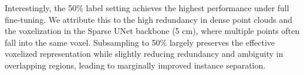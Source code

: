 \documentclass[review,authoryear]{elsarticle}
\begin{document}
Interestingly, the 50\% label setting achieves the highest performance under full fine-tuning. We attribute this to the high redundancy in dense point clouds and the voxelization in the Sparse UNet backbone (5 cm), where multiple points often fall into the same voxel. Subsampling to 50\% largely preserves the effective voxelized representation while slightly reducing redundancy and ambiguity in overlapping regions, leading to marginally improved instance separation.

\end{document}
